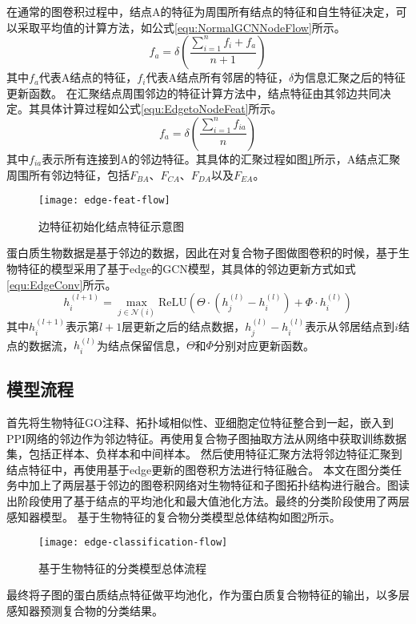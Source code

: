 在通常的图卷积过程中，结点A的特征为周围所有结点的特征和自生特征决定，可以采取平均值的计算方法，如公式\ref{equ:NormalGCNNodeFlow}所示。
\begin{equation}
    \label{equ:NormalGCNNodeFlow}
    f_a=\delta (\frac{\sum_{i = 1}^{n}f_i+f_a}{n+1})
\end{equation}
其中$f_a$代表A结点的特征，$f_i$代表A结点所有邻居的特征，$\delta$为信息汇聚之后的特征更新函数。
在汇聚结点周围邻边的特征计算方法中，结点特征由其邻边共同决定。其具体计算过程如公式\ref{equ:EdgetoNodeFeat}所示。
\begin{equation}
    \label{equ:EdgetoNodeFeat}
    f_a=\delta (\frac{\sum_{i = 1}^{n}f_{ia}}{n})
\end{equation}
其中$f_{ia}$表示所有连接到A的邻边特征。其具体的汇聚过程如图\ref{fig:edge-feat-flow}所示，A结点汇聚周围所有邻边特征，包括$F_{BA}$、$F_{CA}$、$F_{DA}$以及$F_{EA}$。

\begin{figure}[htbp]
    \centering
    \texttt{[image: edge-feat-flow]}
    \caption{边特征初始化结点特征示意图}
    \label{fig:edge-feat-flow}
\end{figure}

蛋白质生物数据是基于邻边的数据，因此在对复合物子图做图卷积的时候，基于生物特征的模型采用了基于edge的GCN模型\cite{wang_dynamic_2019}，其具体的邻边更新方式如式\ref{equ:EdgeConv}所示。
\begin{equation}
    \label{equ:EdgeConv}
    h_i^{(l+1)} = \max_{j \in \mathcal{N}(i)} \mathrm{ReLU}(
    \Theta \cdot (h_j^{(l)} - h_i^{(l)}) + \Phi \cdot h_i^{(l)})
\end{equation}
其中$h_i^{(l+1)}$表示第$l+1$层更新之后的结点数据，$h_j^{(l)} - h_i^{(l)}$表示从邻居结点到$i$结点的数据流，$h_i^{(l)}$为结点保留信息，$\Theta$和$\Phi$分别对应更新函数。
\subsection{模型流程}
\label{subsection:biofeat:Modelflow}
首先将生物特征GO注释、拓扑域相似性、亚细胞定位特征整合到一起，嵌入到PPI网络的邻边作为邻边特征。再使用复合物子图抽取方法从网络中获取训练数据集，包括正样本、负样本和中间样本。
然后使用特征汇聚方法将邻边特征汇聚到结点特征中，再使用基于edge更新的图卷积方法进行特征融合。
本文在图分类任务中加上了两层基于邻边的图卷积网络对生物特征和子图拓扑结构进行融合。图读出阶段使用了基于结点的平均池化和最大值池化方法。最终的分类阶段使用了两层感知器模型。
基于生物特征的复合物分类模型总体结构如图\ref{fig:edge-classification-flow}所示。
\begin{figure}[htbp]
    \centering
    \texttt{[image: edge-classification-flow]}
    \caption{基于生物特征的分类模型总体流程}
    \label{fig:edge-classification-flow}
\end{figure}
最终将子图的蛋白质结点特征做平均池化，作为蛋白质复合物特征的输出，以多层感知器预测复合物的分类结果。

